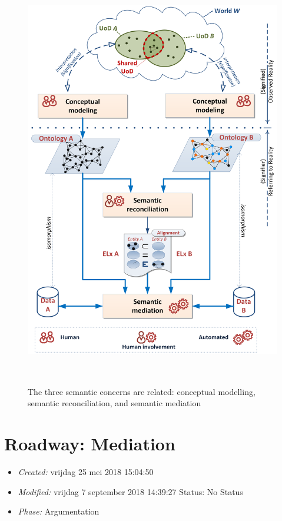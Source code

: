 \documentclass[a4paper,11pt,oneside,oldfontcommands]{memoir}
\theoremstyle{definition}
\theoremstyle{break}		%
\numberwithin{equation}{chapter}
\numberwithin{figure}{chapter}
\begin{document}
\begin{figure}
\hypertarget{fig:3Concerns}{%
\centering
\includegraphics[width=5.15625in,height=7.21875in]{src/images/3SemanticConcerns.png}
\caption{The three semantic concerns are related: conceptual modelling,
semantic reconciliation, and semantic mediation}\label{fig:3Concerns}
}
\end{figure}

\hypertarget{roadway-mediation}{%
\chapter{Roadway: Mediation}\label{roadway-mediation}}

\begin{itemize}
\tightlist
\item
  \emph{Created:} vrijdag 25 mei 2018 15:04:50
\item
  \emph{Modified:} vrijdag 7 september 2018 14:39:27 Status: No Status
\item
  \emph{Phase:} Argumentation
\end{itemize}
\end{document}
